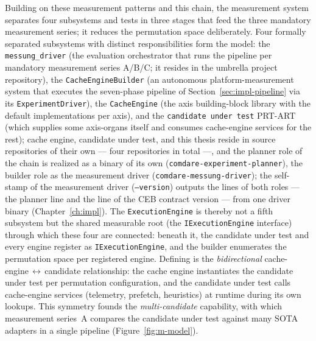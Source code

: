 \begin{nurlang}
Building on these measurement patterns and this chain, the measurement system separates four subsystems and tests in three stages that
feed the three mandatory measurement series; it reduces the permutation space deliberately.
Four formally separated subsystems with distinct responsibilities form the model: the
\texttt{messung\_driver} (the evaluation orchestrator that runs the pipeline per mandatory measurement series A/B/C\@;
it resides in the umbrella project repository), the \texttt{CacheEngineBuilder} (an
autonomous platform-measurement system that executes the seven-phase pipeline of Section~\ref{sec:impl-pipeline}
via its \texttt{ExperimentDriver}), the \texttt{CacheEngine} (the axis building-block library
with the default implementations per axis), and the \texttt{candidate under test} PRT-ART (which supplies some axis-organs
itself and consumes cache-engine services for the rest); cache engine, candidate under test, and this
thesis reside in source repositories of their own --- four repositories in total ---, and the planner role of the
chain is realized as a binary of its own (\texttt{comdare-experiment-planner}), the builder role as the measurement driver
(\texttt{comdare-messung-driver}); the self-stamp of the measurement driver (\texttt{--version}) outputs the
lines of both roles --- the planner line and the line of the CEB contract version --- from one
driver binary (Chapter~\ref{ch:impl}). The \texttt{ExecutionEngine} is thereby not a
fifth subsystem but the shared measurable root (the \texttt{IExecutionEngine} interface) through
which these four are connected: beneath it, the candidate under test and every engine register as
\texttt{IExecutionEngine}, and the builder enumerates the permutation space per registered engine.
Defining is the \emph{bidirectional}
cache-engine\,$\leftrightarrow$\,candidate relationship: the cache engine instantiates the candidate under test per
permutation configuration, and the candidate under test calls cache-engine services (telemetry, prefetch,
heuristics) at runtime during its own lookups. This symmetry founds the \emph{multi-candidate} capability,
with which measurement series~A compares the candidate under test against many SOTA adapters in a single pipeline
(Figure~\ref{fig:m-model}).


\end{nurlang}
